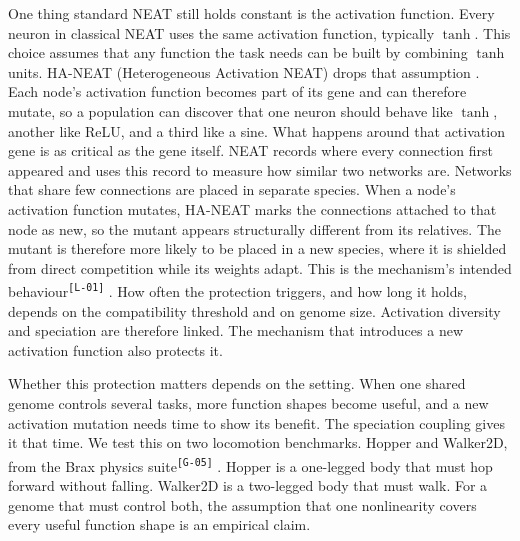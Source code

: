 \documentclass[12pt]{article}
\newcommand{\revID}[1]{\textsuperscript{\scriptsize\texttt{[#1]}}}
\newcommand{\revGram}[2]{\textcolor{lrRed}{#2}\revID{#1}}       %
\newcommand{\revClarity}[2]{\textcolor{lrOrange}{#2}\revID{#1}} %
\begin{document}
One thing standard NEAT still holds constant is the activation function.
Every neuron in classical NEAT uses the same activation function, typically $\tanh$.
This choice assumes that any function the task needs can be built by combining $\tanh$ units.
HA-NEAT (Heterogeneous Activation NEAT) drops that assumption \parencite{hagg_evolving_2017}.
Each node's activation function becomes part of its gene and can therefore mutate, so a population can discover that one neuron should behave like $\tanh$, another like ReLU, and a third like a sine.
What happens around that activation gene is as critical as the gene itself.
NEAT records where every connection first appeared and uses this record to measure how similar two networks are. Networks that share few connections are placed in separate species.
When a node's activation function mutates, HA-NEAT marks the connections attached to that node as new, so the mutant appears structurally different from its relatives.
The mutant is therefore more likely to be placed in a new species, where it is shielded from direct competition while its weights adapt. \revClarity{L-01}{This is the mechanism's intended behaviour} \parencite{hagg_evolving_2017}. How often the protection triggers, and how long it holds, depends on the compatibility threshold and on genome size.
Activation diversity and speciation are therefore linked. The mechanism that introduces a new activation function also protects it.

Whether this protection matters depends on the setting.
When one shared genome controls several tasks, more function shapes become useful, and a new activation mutation needs time to show its benefit.
The speciation coupling gives it that time.
\revGram{G-05}{We test this on two locomotion benchmarks. Hopper and Walker2D, from the Brax physics suite} \parencite{freeman_brax_2021}.
Hopper is a one-legged body that must hop forward without falling. Walker2D is a two-legged body that must walk.
For a genome that must control both, the assumption that one nonlinearity covers every useful function shape is an empirical claim.


\end{document}
